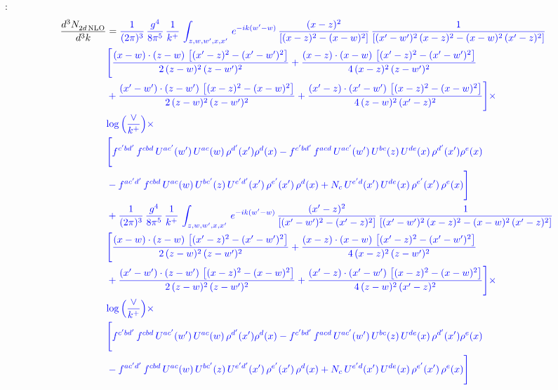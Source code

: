 \documentclass[10pt]{article}
\numberwithin{equation}{section}
\newcommand{\new}[1]{{\color{blue}#1}}
\newcommand{\nc}{\color{blue}}
\begin{document}
\noindent \new{From \texttt{Other\_terms.tex}}:
\begin{align}
 \frac{d^{3}N_{2d\,\rm NLO}^{\rm}}{d^{3}k}  & =  \nc \frac{1}{(2\pi)^{3}}\, \frac{g^{4}}{8\pi^{5}}\,\frac{1}{k^{+}}\,\int_{z,w,w^{\prime},x,x'}\, e^{-ik(w^{\prime}-w)}\,\frac{(x-z)^{2}}{\left[(x-z)^{2}-(x-w)^{2}\right]}\,\frac{1}{\left[(x'-w')^{2}\,(x-z)^{2} - (x-w)^{2}\,(x'-z)^{2}\right]}\notag \\ & \nc  \Bigg[\frac{(x-w)\cdot (z-w)\, \left[(x'-z)^{2}-(x'-w')^{2}\right]}{2\, (z-w)^{2}\, (z-w')^{2}}  + \frac{(x-z)\cdot (x-w)\,\left[(x'-z)^{2}-(x'-w')^{2}\right] }{4\,(x-z)^{2}\,(z-w')^{2}}\notag \\ & \nc  +\frac{(x'-w')\cdot (z-w')\, \left[(x-z)^{2}-(x-w)^{2}\right]}{2\, (z-w)^{2}\, (z-w')^{2}}+ \frac{(x'-z)\cdot (x'-w')\, \left[(x-z)^{2}-(x-w)^{2}\right]}{4\, (z-w)^{2}\,(x'-z)^{2}}\Bigg]\times\,\notag \\ & \nc  \new{\log{\left(\frac{\vee}{k^{+}}\right)}} \times\notag \\ & \nc  \Bigg[f^{c'bd'}\,f^{cbd}\, U^{ac'}(w')\,U^{ac}(w)\,\rho^{d'}(x')\rho^{d}(x)- f^{c'bd'}\,f^{acd}\,U^{ac'}(w')\,U^{bc}(z)\,U^{de}(x)\,\rho^{d'}(x')\rho^{e}(x) \notag \\ & \nc  -f^{ac'd'}\,f^{cbd}\,U^{ac}(w)\,U^{bc'}(z)\,U^{e'd'}(x')\,\rho^{e'}(x')\,\rho^{d}(x) +N_{c}\,U^{e'd}(x')\,U^{de}(x)\,\rho^{e'}(x')\,\rho^{e}(x)\Bigg] \notag \\
& \nc  +\frac{1}{(2\pi)^{3}}\, \frac{g^{4}}{8\pi^{5}}\,\frac{1}{k^{+}}\,\int_{z,w,w^{\prime},x,x'}\, e^{-ik(w^{\prime}-w)}\,\frac{(x'-z)^{2}}{\left[(x'-w')^{2}-(x'-z)^{2}\right]}\,\frac{1}{\left[(x'-w')^{2}\,(x-z)^{2} - (x-w)^{2}\,(x'-z)^{2}\right]}\notag \\ & \nc  \Bigg[\frac{(x-w)\cdot (z-w)\, \left[(x'-z)^{2}-(x'-w')^{2}\right]}{2\, (z-w)^{2}\, (z-w')^{2}}  + \frac{(x-z)\cdot (x-w)\,\left[(x'-z)^{2}-(x'-w')^{2}\right] }{4\,(x-z)^{2}\,(z-w')^{2}}\notag \\ & \nc  +\frac{(x'-w')\cdot (z-w')\, \left[(x-z)^{2}-(x-w)^{2}\right]}{2\, (z-w)^{2}\, (z-w')^{2}}+ \frac{(x'-z)\cdot (x'-w')\, \left[(x-z)^{2}-(x-w)^{2}\right]}{4\, (z-w)^{2}\,(x'-z)^{2}}\Bigg]\times\,\notag \\ & \nc  \new{\log{\left(\frac{\vee}{k^{+}}\right)}} \times\notag \\ & \nc  \Bigg[f^{c'bd'}\,f^{cbd}\, U^{ac'}(w')\,U^{ac}(w)\,\rho^{d'}(x')\rho^{d}(x)- f^{c'bd'}\,f^{acd}\,U^{ac'}(w')\,U^{bc}(z)\,U^{de}(x)\,\rho^{d'}(x')\rho^{e}(x) \notag \\ & \nc  -f^{ac'd'}\,f^{cbd}\,U^{ac}(w)\,U^{bc'}(z)\,U^{e'd'}(x')\,\rho^{e'}(x')\,\rho^{d}(x) +N_{c}\,U^{e'd}(x')\,U^{de}(x)\,\rho^{e'}(x')\,\rho^{e}(x)\Bigg] \label{eq:Bnew:G2I2d}
\end{align}
\end{document}
